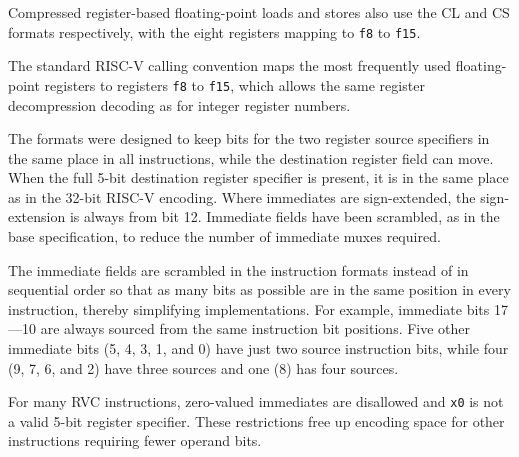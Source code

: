 Compressed register-based floating-point loads and stores also use the
CL and CS formats respectively, with the eight registers mapping to
{\tt f8} to {\tt f15}.

\begin{commentary}
The standard RISC-V calling convention maps the most frequently used
floating-point registers to registers {\tt f8} to {\tt f15}, which
allows the same register decompression decoding as for integer
register numbers.
\end{commentary}

The formats were designed to keep bits for the two register source
specifiers in the same place in all instructions, while the
destination register field can move.  When the full 5-bit destination
register specifier is present, it is in the same place as in the
32-bit RISC-V encoding.  Where immediates are
sign-extended, the sign-extension is always from bit 12.  Immediate
fields have been scrambled, as in the base specification, to reduce
the number of immediate muxes required.

\begin{commentary}
The immediate fields are scrambled in the instruction formats instead
of in sequential order so that as many bits as possible are in the
same position in every instruction, thereby simplifying
implementations. For example, immediate bits 17---10 are always sourced from
the same instruction bit positions.  Five other immediate bits (5, 4,
3, 1, and 0) have just two source instruction bits, while four (9, 7,
6, and 2) have three sources and one (8) has four sources.
\end{commentary}

For many RVC instructions, zero-valued immediates are disallowed and
{\tt x0} is not a valid 5-bit register specifier.  These restrictions
free up encoding space for other instructions requiring fewer operand
bits.

